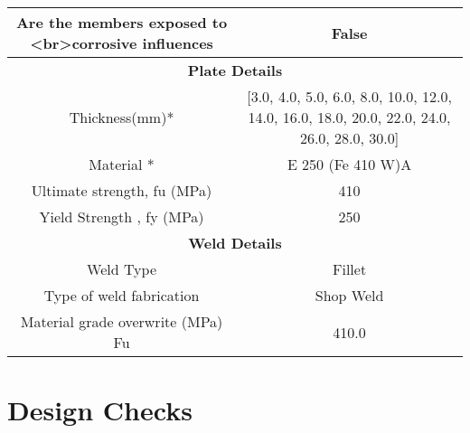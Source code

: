 \documentclass{article}%
\begin{document}
\begin{longtable}{|p{5cm}|p{2cm}|p{2cm}|p{2cm}|p{5cm}|}
\hline%
\hline%
\multicolumn{3}{|c|}{Are the members exposed to <br>corrosive influences}&\multicolumn{2}{|c|}{False}\\%
\hline%
\hline%
\multicolumn{5}{|c|}{\textbf{Plate Details}}\\%
\hline%
\hline%
\multicolumn{3}{|c|}{Thickness(mm)*}&\multicolumn{2}{|c|}{{[}3.0, 4.0, 5.0, 6.0, 8.0, 10.0, 12.0, 14.0, 16.0, 18.0, 20.0, 22.0, 24.0, 26.0, 28.0, 30.0{]}}\\%
\hline%
\hline%
\multicolumn{3}{|c|}{Material *}&\multicolumn{2}{|c|}{E 250 (Fe 410 W)A}\\%
\hline%
\hline%
\multicolumn{3}{|c|}{Ultimate strength, fu (MPa)}&\multicolumn{2}{|c|}{410}\\%
\hline%
\hline%
\multicolumn{3}{|c|}{Yield Strength , fy (MPa)}&\multicolumn{2}{|c|}{250}\\%
\hline%
\hline%
\multicolumn{5}{|c|}{\textbf{Weld Details}}\\%
\hline%
\hline%
\multicolumn{3}{|c|}{Weld Type}&\multicolumn{2}{|c|}{Fillet}\\%
\hline%
\hline%
\multicolumn{3}{|c|}{Type of weld fabrication}&\multicolumn{2}{|c|}{Shop Weld}\\%
\hline%
\hline%
\multicolumn{3}{|c|}{Material grade overwrite (MPa) Fu}&\multicolumn{2}{|c|}{410.0}\\%
\hline%
\end{longtable}

%
%
\newpage%
\section{Design Checks}%
\label{sec:DesignChecks}%
\end{document}
